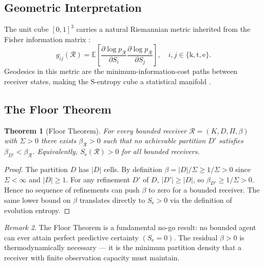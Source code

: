 \documentclass[twocolumn,11pt,a4paper]{article}
\theoremstyle{plain}
\newtheorem{theorem}{Theorem}[section]
\theoremstyle{definition}
\theoremstyle{remark}
\newtheorem{remark}[theorem]{Remark}
\newcommand{\Se}{S_{\mathrm{e}}}
\newcommand{\E}{\mathbb{E}}
\newcommand{\abs}[1]{\left|#1\right|}
\begin{document}
\subsection{Geometric Interpretation}

The unit cube $[0,1]^3$ carries a natural Riemannian metric inherited from the Fisher information matrix \citep{fisher1925,amari1998}:
\begin{equation}
  g_{ij}(\mathcal{R}) = \E\!\left[\frac{\partial \log p_\mathcal{R}}{\partial S_i}\frac{\partial \log p_\mathcal{R}}{\partial S_j}\right], \quad i,j\in\{\mathrm{k,t,e}\}.
\end{equation}
Geodesics in this metric are the minimum-information-cost paths between receiver states, making the S-entropy cube a statistical manifold \citep{docarmo1992}.

\subsection{The Floor Theorem}

\begin{theorem}[Floor Theorem]
\label{thm:floor}
For every bounded receiver $\mathcal{R} = (K,D,\Pi,\beta)$ with $\Sigma > 0$ there exists $\beta_{\mathcal{R}} > 0$ such that no achievable partition $D'$ satisfies $\beta_{D'} < \beta_{\mathcal{R}}$.  Equivalently, $\Se(\mathcal{R}) > 0$ for all bounded receivers.
\end{theorem}

\begin{proof}
The partition $D$ has $\abs{D}$ cells. By definition $\beta = \abs{D}/\Sigma \ge 1/\Sigma > 0$ since $\Sigma < \infty$ and $\abs{D} \ge 1$.  For any refinement $D'$ of $D$, $\abs{D'} \ge \abs{D}$, so $\beta_{D'} \ge 1/\Sigma > 0$.  Hence no sequence of refinements can push $\beta$ to zero for a bounded receiver.  The same lower bound on $\beta$ translates directly to $\Se > 0$ via the definition of evolution entropy.
\end{proof}

\begin{remark}
The Floor Theorem is a fundamental no-go result: no bounded agent can ever attain perfect predictive certainty $(\Se = 0)$.  The residual $\beta > 0$ is thermodynamically necessary — it is the minimum partition density that a receiver with finite observation capacity must maintain.
\end{remark}
\end{document}
